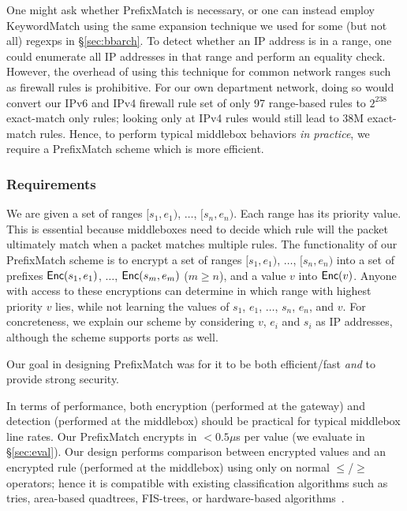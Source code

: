 One might ask whether PrefixMatch is necessary, or one can instead employ KeywordMatch using the same expansion technique we used for some (but not all) regexps in \S\ref{sec:bbarch}. 
To detect whether an IP address is in a range, one could enumerate all IP addresses in that range and perform an equality check. However, the overhead of using this technique for common network ranges such as firewall rules is prohibitive.
For our own department network, doing so would convert our IPv6 and IPv4 firewall rule set of only 97 range-based rules to $2^{238}$ exact-match only rules; looking only at IPv4 rules would still lead to 38M exact-match rules.
Hence, to perform typical middlebox behaviors {\it in practice}, we require a PrefixMatch scheme which is more efficient.

\subsubsection{Requirements}
We are given a set of ranges $[s_1, e_1)$, $\dots$, $[s_n, e_n)$. Each range has its priority value. This is essential because middleboxes need to decide which rule will the packet ultimately match when a packet matches multiple rules. The functionality of our PrefixMatch scheme is to encrypt a set of ranges $[s_1, e_1)$, $\dots$, $[s_n, e_n)$ into a set of prefixes $\mathsf{Enc}(s_1, e_1)$, $\dots$, $\mathsf{Enc}(s_m, e_m)$ ($m \geq n$), and a value $v$ into $\mathsf{Enc}(v)$. Anyone with access to these encryptions can determine in which range with highest priority $v$ lies, while not learning the values of $s_1$, $e_1$, $\dots$, $s_n$, $e_n$, and $v$. 
For concreteness, we explain our scheme by considering $v$, $e_i$ and $s_i$ as IP addresses, although the scheme supports ports as well.


Our goal in designing PrefixMatch was for it to be both efficient/fast {\em and} to provide strong security.

In terms of performance, both encryption (performed at the gateway) and detection (performed at the middlebox) should be practical for typical middlebox line rates.
Our PrefixMatch encrypts in $< 0.5\mu$s per value (we evaluate in \S\ref{sec:eval}).
Our design performs comparison between encrypted values and an encrypted rule (performed at the middlebox) using only on normal $\leq$/$\geq$ operators; hence it is compatible with existing classification algorithms such as tries, area-based quadtrees, FIS-trees, or hardware-based algorithms~\cite{packet_classif}.

